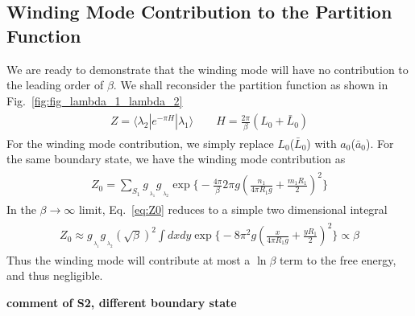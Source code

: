 \subsection{Winding Mode Contribution to the Partition Function}
\label{app_sub:winding_contribution}
We are ready to demonstrate that the winding mode will have no contribution to the leading order of $\beta$. We shall reconsider the partition function as shown in Fig.~\ref{fig:fig_lambda_1_lambda_2}
\begin{eqnarray}\begin{aligned}
Z=\langle\lambda_2|e^{-\pi H}|\lambda_1\rangle\qquad H=\frac{2\pi}{\beta}(L_0+\bar{L}_0)
\end{aligned}\end{eqnarray}
For the winding mode contribution, we simply replace $L_0$($\bar{L}_0$) with $a_0$($\bar{a}_0$). For the same boundary state, we have the winding mode contribution as
\begin{eqnarray}\begin{aligned}
\label{eq:Z0}
Z_0 = \sum_{S_1 } g_{\,\!_{\lambda_1} }g_{\,\!_{\lambda_2} } \exp\Big\{- \frac{4\pi}{\beta} 2 \pi g ( \frac{n_1}{ 4 \pi R_1 g} + \frac{m_1 R_1 }{ 2} )^2 \Big\}
\end{aligned}\end{eqnarray}
In the $\beta\rightarrow\infty$ limit, Eq.~\eqref{eq:Z0} reduces to a simple two dimensional integral
\begin{eqnarray}\begin{aligned}
Z_0\approx g_{\,\!_{\lambda_1} }g_{\,\!_{\lambda_2} } (\sqrt{\beta})^2\int dxdy\exp\Big\{-8 \pi^2 g ( \frac{x}{ 4 \pi R_1 g} + \frac{y R_1 }{ 2} )^2 \Big\}\propto\beta
\end{aligned}\end{eqnarray}
Thus the winding mode will contribute at most a $\ln\beta$ term to the free energy, and thus negligible. 

{\bf\color{red}comment of S2, different boundary state}

